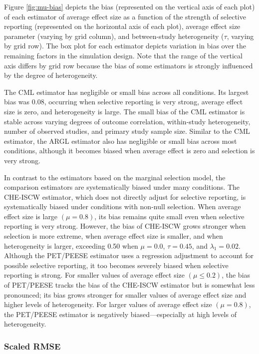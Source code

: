 \documentclass[
  man, donotrepeattitle,floatsintext]{apa7}
\begin{document}
Figure \ref{fig:mu-bias} depicts the bias (represented on the vertical axis of each plot) of each estimator of average effect size as a function of the strength of selective reporting (represented on the horizontal axis of each plot), average effect size parameter (varying by grid column), and between-study heterogeneity (\(\tau\), varying by grid row).
The box plot for each estimator depicts variation in bias over the remaining factors in the simulation design.
Note that the range of the vertical axis differs by grid row because the bias of some estimators is strongly influenced by the degree of heterogeneity.

The CML estimator has negligible or small bias across all conditions.
Its largest bias was 0.08, occurring when selective reporting is very strong, average effect size is zero, and heterogeneity is large.
The small bias of the CML estimator is stable across varying degrees of outcome correlation, within-study heterogeneity, number of observed studies, and primary study sample size.
Similar to the CML estimator, the ARGL estimator also has negligible or small bias across most conditions, although it becomes biased when average effect is zero and selection is very strong.

In contrast to the estimators based on the marginal selection model, the comparison estimators are systematically biased under many conditions.
The CHE-ISCW estimator, which does not directly adjust for selective reporting, is systematically biased under conditions with non-null selection.
When average effect size is large \((\mu = 0.8)\), its bias remains quite small even when selective reporting is very strong.
However, the bias of CHE-ISCW grows stronger when selection is more extreme, when average effect size is smaller, and when heterogeneity is larger, exceeding 0.50 when \(\mu = 0.0\), \(\tau = 0.45\), and \(\lambda_1 = 0.02\).
Although the PET/PEESE estimator uses a regression adjustment to account for possible selective reporting, it too becomes severely biased when selective reporting is strong.
For smaller values of average effect size \((\mu \leq 0.2)\), the bias of PET/PEESE tracks the bias of the CHE-ISCW estimator but is somewhat less pronounced; its bias grows stronger for smaller values of average effect size and higher levels of heterogeneity.
For larger values of average effect size \((\mu = 0.8)\), the PET/PEESE estimator is negatively biased---especially at high levels of heterogeneity.

\subsubsection{Scaled RMSE}\label{scaled-rmse}
\end{document}
